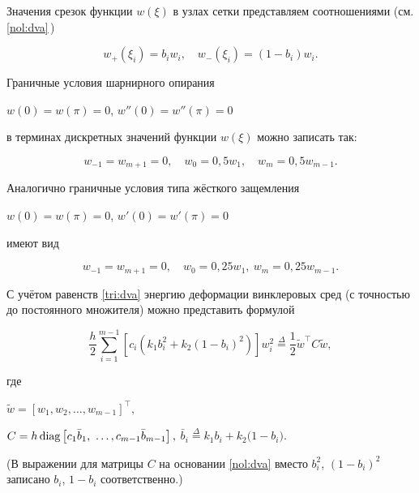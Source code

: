 Значения срезок функции $w(\xi)$ в узлах сетки представляем соотношениями (см. \eqref{nol:dva}\,)

\begin{equation}\label{tri:dva}

w_+(\xi_i)=b_iw_i,\quad  w_-(\xi_i)=(1-b_i)w_i.

\end{equation}





Граничные условия шарнирного опирания

$w(0)=w(\pi)=0$, $w''(0)=w''(\pi)=0$

в терминах дискретных значений функции $w(\xi)$ можно записать так:

\begin{equation}\label{tri:tri}

w_{-1}=w_{m+1}=0,\quad  w_{0}=0,5 w_1,\quad  w_{m}=0,5w_{m-1}.

\end{equation}



Аналогично граничные условия типа жёсткого защемления

$w(0)=w(\pi)=0$, $w'(0)=w'(\pi)=0$

имеют вид

\begin{equation}\label{tri:chetyre}

w_{-1}=w_{m+1}=0,\quad  w_{0}=0,25w_1,\ w_{m}=0,25w_{m-1}.

\end{equation}



С учётом равенств \eqref{tri:dva} энергию деформации винклеровых сред (с точностью до постоянного множителя) можно представить формулой

\begin{equation}\label{tri:pyat}

\frac{h}{2}\sum_{i=1}^{m-1}\left[c_i(k_1b_i^2+k_2(1-b_i)^2)\right]w_i^2\stackrel{\Delta}{=}\frac{1}{2}\tilde{w}^\top C\tilde{w},

\end{equation}

где 

$\tilde{w}=[w_1, w_2, \ldots, w_{m-1}]^\top,$

$C=h\, {\rm diag}\left[c_{1}\bar{b}_1,\ \ldots, c_{m-1}\bar{b}_{m-1}\right],$ $\bar{b}_{i}\stackrel{\Delta}{=}k_1b_i+k_2{(1-b_i}).$

(В выражении для матрицы $C$ на основании \eqref{nol:dva} вместо $b_i^2$, $(1-b_i)^2$ записано $b_i$, $1-b_i$ соответственно.)



